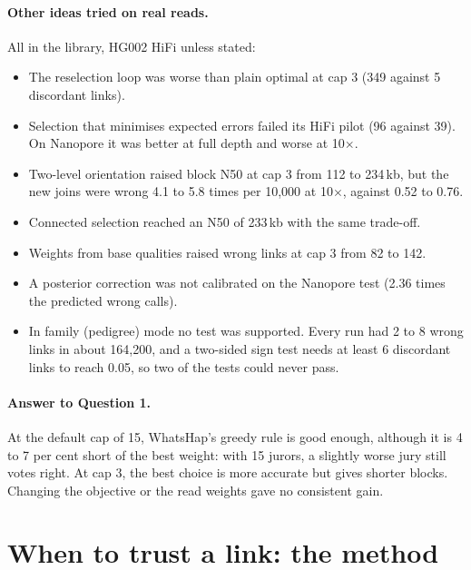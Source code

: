 \documentclass[11pt]{article}
\begin{document}
\paragraph{Other ideas tried on real reads.} All in the library, HG002 HiFi
unless stated:

\begin{itemize}
\item The reselection loop was worse than plain optimal at cap 3 (349
  against 5 discordant links).
\item Selection that minimises expected errors failed its HiFi pilot (96
  against 39). On Nanopore it was better at full depth and worse at
  10$\times$.
\item Two-level orientation raised block N50 at cap 3 from 112 to 234\,kb,
  but the new joins were wrong 4.1 to 5.8 times per 10{,}000 at 10$\times$,
  against 0.52 to 0.76.
\item Connected selection reached an N50 of 233\,kb with the same trade-off.
\item Weights from base qualities raised wrong links at cap 3 from 82 to
  142.
\item A posterior correction was not calibrated on the Nanopore test (2.36
  times the predicted wrong calls).
\item In family (pedigree) mode no test was supported. Every run had 2 to 8
  wrong links in about 164{,}200, and a two-sided sign test needs at least 6
  discordant links to reach 0.05, so two of the tests could never pass.
\end{itemize}

\paragraph{Answer to Question 1.} At the default cap of 15, WhatsHap's
greedy rule is good enough, although it is 4 to 7 per cent short of the best
weight: with 15 jurors, a slightly worse jury still votes right. At cap 3,
the best choice is more accurate but gives shorter blocks. Changing the
objective or the read weights gave no consistent gain.

\section{When to trust a link: the method}\label{sec:promise}
\end{document}
